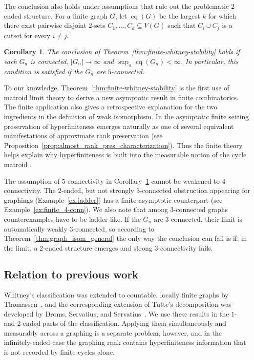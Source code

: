 \documentclass{article}
\theoremstyle{plain}
\newtheorem{cor}[thm]{Corollary}
\theoremstyle{definition}
\begin{document}
The conclusion also holds under assumptions that rule out the problematic $2$-ended structure. For a finite graph $G$, let $\operatorname{cq}(G)$ be the largest $k$ for which there exist pairwise disjoint $2$-sets $C_1,\ldots,C_k\subseteq V(G)$ such that $C_i\cup C_j$ is a cutset for every $i\neq j$.

\begin{cor}\label{cor:cut_quadruples}
    The conclusion of Theorem~\ref{thm:finite-whitney-stability} holds if each $G_n$ is connected, $|G_n|\to\infty$ and $\sup_n\operatorname{cq}(G_n)<\infty$. In particular, this condition is satisfied if the $G_n$ are $5$-connected.
\end{cor}

To our knowledge, Theorem~\ref{thm:finite-whitney-stability} is the first use of matroid limit theory to derive a new asymptotic result in finite combinatorics. The finite application also gives a retrospective explanation for the two ingredients in the definition of weak isomorphism. In the asymptotic finite setting preservation of hyperfiniteness emerges naturally as one of several equivalent manifestations of approximate rank preservation (see Proposition~\ref{prop:almost_rank_pres_characterization}). Thus the finite theory helps explain why hyperfiniteness is built into the measurable notion of the cycle matroid \cite{lovasz2024matroid, berczi2026cycle}.

The assumption of $5$-connectivity in Corollary~\ref{cor:cut_quadruples} cannot be weakened to $4$-connectivity. The $2$-ended, but not strongly $3$-connected obstruction appearing for graphings (Example~\ref{ex:ladder}) has a finite asymptotic counterpart (see Example~\ref{ex:finite_4-conn}). We also note that among $3$-connected graphs counterexamples have to be ladder-like. If the $G_n$ are $3$-connected, their limit is automatically weakly $3$-connected, so according to Theorem~\ref{thm:graph_isom_general} the only way the conclusion can fail is if, in the limit, a $2$-ended structure emerges and strong $3$-connectivity fails. 


\subsection{Relation to previous work}\label{subsec:related_work}

Whitney's classification was extended to countable, locally finite graphs by Thomassen~\cite{thomassen1982duality}, and the corresponding extension of Tutte's decomposition was developed by Droms, Servatius, and Servatius~\cite{droms1995structure}. We use these results in the $1$- and $2$-ended parts of the classification. Applying them simultaneously and measurably across a graphing is a separate problem, however, and in the infinitely-ended case the graphing rank contains hyperfiniteness information that is not recorded by finite cycles alone.
\end{document}
